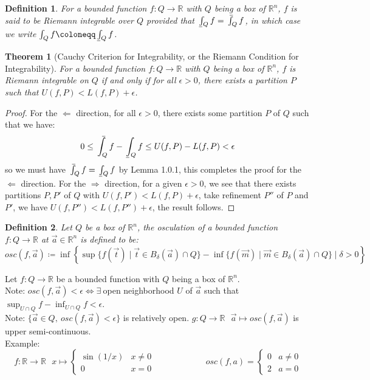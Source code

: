 \documentclass[11pt,oneside]{book}
\theoremstyle{break}
\theoremstyle{break}
\newtheorem{thm}{Theorem}[section]
\newtheorem{defn}{Definition}[corL]
\def\upint{\mathchoice%
    {\mkern13mu\overline{\vphantom{\intop}\mkern7mu}\mkern-20mu}%
    {\mkern7mu\overline{\vphantom{\intop}\mkern7mu}\mkern-14mu}%
    {\mkern7mu\overline{\vphantom{\intop}\mkern7mu}\mkern-14mu}%
    {\mkern7mu\overline{\vphantom{\intop}\mkern7mu}\mkern-14mu}%
  \int}
\def\lowint{\mkern3mu\underline{\vphantom{\intop}\mkern7mu}\mkern-10mu\int}
\newcommand{\R}{\mathbb{R}}
\newcommand{\note}{\color{red}Note: \color{black}}
\newcommand{\example}{\color{green}Example: \color{black}}
\begin{document}
\begin{defn}
For a bounded function $f:Q \to \R$ with $Q$ being a box of $\R^n$, $f$ is said to be Riemann integrable over $Q$ provided that $\lowint_Q f = \upint_Q f$, in which case we write $\int_Q f \coloneqq \lowint_Q f$.
\end{defn}

\begin{thm}[Cauchy Criterion for Integrability, or the Riemann Condition for Integrability]
For a bounded function $f:Q \to \R$ with $Q$ being a box of $\R^n$, $f$ is Riemann integrable on $Q$ if and only if for all $\epsilon>0$, there exists a partition $P$ such that $U(f,P) < L(f,P) + \epsilon$.
\end{thm}
\begin{proof}
For the $\Leftarrow$ direction, for all $\epsilon>0$, there exists some partition $P$ of $Q$ such that we have:
$$0 \leq \upint_Q f - \lowint_Q f \leq U(f,P) - L(f,P) < \epsilon$$
so we must have $\upint_Q f = \lowint_Q f $ by Lemma 1.0.1, this completes the proof for the $\Leftarrow$ direction. For the $\Rightarrow$ direction, for a given $\epsilon >0$, we see that there exists partitions $P,P'$ of $Q$ with $U(f,P') < L(f,P)+\epsilon$, take refinement $P''$ of $P$ and $P'$, we have $U(f,P'') < L(f,P'')+\epsilon$, the result follows.
\end{proof}


\begin{defn}
Let $Q $ be a box of $\R^n$, the osculation of a bounded function $f:Q \to \R$ at $\vec{a}\in \R^n$ is defined to be: 
$$osc(f,\vec{a}) \coloneqq \inf\left\{ \sup\{ f(\vec{t})\mid \vec{t} \in B_\delta(\vec{a})\cap Q\}  - \inf\{ f(\vec{m})\mid \vec{m} \in B_\delta(\vec{a})\cap Q\}  \mid {\delta>0} \right\} $$
\end{defn}

Let $f:Q \to \R$ be a bounded function with $Q$ being a box of $\R^n$. \\
\note $osc(f,\vec{a}) < \epsilon \iff \exists\ $open neighborhood $U$ of $\vec{a}$ such that $\sup_{U\cap Q} f - \inf_{U\cap Q} f < \epsilon$.\\ 
\note $\{ \vec{a} \in Q,\ osc(f,\vec{a})<\epsilon\}$ is relatively open. $g:Q \to \R \ \ \ \vec{a}\mapsto osc(f,\vec{a})$ is upper semi-continuous.\\

\example
$$f: \R \to \R \ \ \ x\mapsto\begin{cases} \sin(1/x) & x \neq 0 \\ 0 & x = 0\end{cases} \qquad\qquad\qquad osc(f,a) = \begin{cases} 0 & a \neq 0 \\ 2 & a = 0 \end{cases}$$
\end{document}
